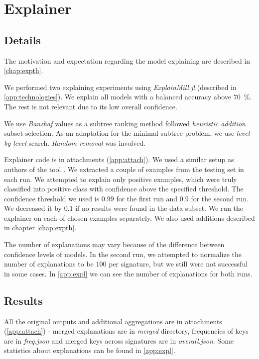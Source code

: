 \section{Explainer}
\subsection{Details}
The motivation and expectation regarding the model explaining are described in \ref{chap:expth}.

We performed two explaining experiments using \emph{ExplainMill.jl} (described in \ref{app:technologies}). We explain all models with a balanced accuracy above $70$~\%.  The rest is not relevant due to its low overall confidence.

We use \emph{Banzhaf} values as a subtree ranking method followed \emph{heuristic addition} subset selection. As an adaptation for the minimal subtree problem, we use \emph{level by level} search. \emph{Random removal} was involved.

Explainer code is in attachments (\ref{app:attach}). We used a similar setup as authors of the tool \cite{Pevny2020}. We extracted a couple of examples from the testing set in each run. We attempted to explain only positive examples, which were truly classified into positive class with confidence above the specified threshold. The confidence threshold we used is $0.99$ for the first run and $0.9$ for the second run. We decreased it by $0.1$ if no results were found in the data subset. We run the explainer on each of chosen examples separately. We also used additions described in chapter \ref{chap:expth}.

The number of explanations may vary because of the difference between confidence levels of models. In the second run, we attempted to normalize the number of explanations to be $100$ per signature, but we still were not successful in some cases.  In \ref{app:expl} we can see the number of explanations for both runs.

\subsection{Results}
All the original outputs and additional aggregations are in attachments (\ref{app:attach}) - merged explanations are in \emph{merged} directory, frequencies of keys are in \emph{freq.json} and merged keys across signatures are in \emph{overall.json}. Some statistics about explanations can be found in \ref{app:expl}.

